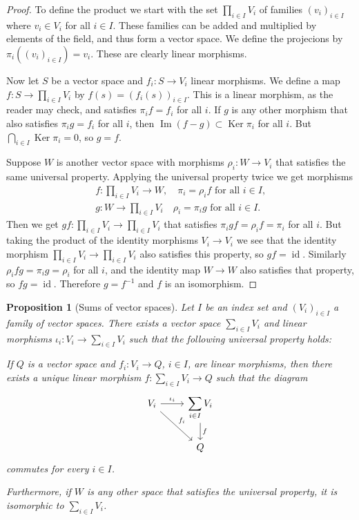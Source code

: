 \documentclass[11pt]{article}
\newtheorem{prop}[theo]{Proposition}
\theoremstyle{definition}
\DeclareMathOperator{\Ker}{Ker}
\DeclareMathOperator{\Img}{Im}
\DeclareMathOperator{\id}{id}
\begin{document}
\begin{proof}
To define the product we start with the set $\prod_{i \in I} V_i$ of families $(v_i)_{i \in I}$ where $v_i \in V_i$ for all $i \in I$.
These families can be added and multiplied by elements of the field, and thus form a vector space.
We define the projecions by $\pi_i((v_i)_{i \in I}) = v_i$.
These are clearly linear morphisms.

Now let $S$ be a vector space and $f_i : S \to V_i$ linear morphisms.
We define a map $f : S \to \prod_{i \in I} V_i$ by $f(s) = (f_i(s))_{i \in I}$.
This is a linear morphism, as the reader may check, and satisfies $\pi_i f = f_i$ for all $i$.
If $g$ is any other morphism that also satisfies $\pi_i g = f_i$ for all $i$, then $\Img(f - g) \subset \Ker \pi_i$ for all $i$.
But $\bigcap_{i \in I} \Ker \pi_i = 0$, so $g = f$.

Suppose $W$ is another vector space with morphisms $\rho_i : W \to V_i$ that satisfies the same universal property.
Applying the universal property twice we get morphisms
\begin{gather*}
f : \prod_{i \in I} V_i \to W,
\quad
\pi_i = \rho_i f \text{ for all $i \in I$,}
\\
g : W \to \prod_{i \in I} V_i
\quad
\rho_i = \pi_i g  \text{ for all $i \in I$.}
\end{gather*}
Then we get $gf : \prod_{i \in I} V_i \to \prod_{i \in I} V_i$ that satisfies $\pi_i gf = \rho_i f = \pi_i$ for all $i$.
But taking the product of the identity morphisms $V_i \to V_i$ we see that the identity morphism $\prod_{i \in I} V_i \to \prod_{i \in I} V_i$ also satisfies this property, so $gf = \id$.
Similarly $\rho_i fg = \pi_i g = \rho_i$ for all $i$, and the identity map $W \to W$ also satisfies that property, so $fg = \id$.
Therefore $g = f^{-1}$ and $f$ is an isomorphism.
\end{proof}


\begin{prop}[Sums of vector spaces]
\label{prop:coproduct}
Let $I$ be an index set and $(V_i)_{i\in I}$ a family of vector spaces.
There exists a vector space $\sum_{i\in I} V_i$ and linear morphisms $\iota_i : V_i \to \sum_{i \in I} V_i$ such that the following universal property holds:

If $Q$ is a vector space and $f_i : V_i \to Q$, $i \in I$, are linear morphisms, then there exists a unique linear morphism $f : \sum_{i \in I} V_i \to Q$ such that the diagram
\[
\begin{tikzcd}
V_i \ar[dr,"f_i"] \ar[r,"\iota_i"] & \displaystyle\sum_{i \in I} V_i \ar[d,"f"]
\\
             & Q
\end{tikzcd}
\]
commutes for every $i \in I$.

Furthermore, if $W$ is any other space that satisfies the universal property, it is isomorphic to $\sum_{i \in I} V_i$.
\end{prop}
\end{document}
